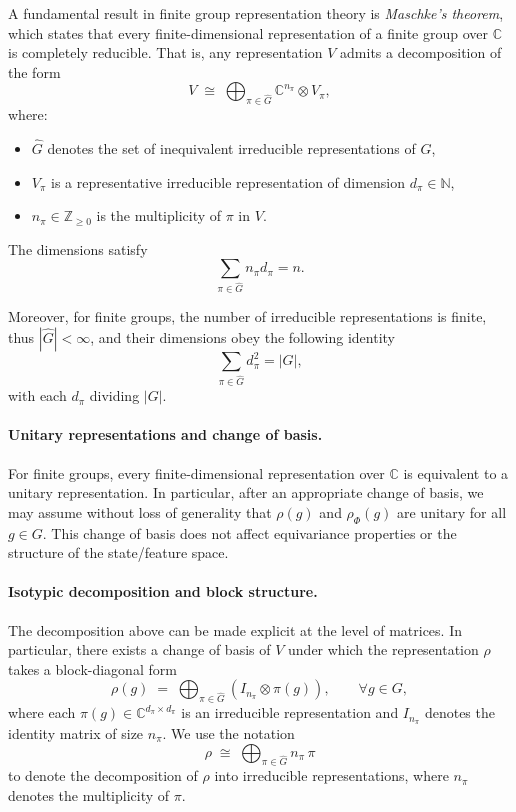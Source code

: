 \documentclass[11pt]{article}
\theoremstyle{plain}
\theoremstyle{definition}
\theoremstyle{remark}
\begin{document}
A fundamental result in finite group representation theory is \emph{Maschke’s theorem}, which states that every finite-dimensional representation of a finite group over $\mathbb{C}$ is completely reducible. That is, any representation $V$ admits a decomposition of the form
\[
V \;\cong\; \bigoplus_{\pi \in \widehat{G}} \mathbb{C}^{n_\pi} \otimes V_\pi,
\]
where:
\begin{itemize}
    \item $\widehat{G}$ denotes the set of inequivalent irreducible representations of $G$,
    \item $V_\pi$ is a representative irreducible representation of dimension $d_\pi \in \mathbb{N}$,
    \item $n_\pi \in \mathbb{Z}_{\ge 0}$ is the multiplicity of $\pi$ in $V$.
\end{itemize}
The dimensions satisfy
\[
\sum_{\pi \in \widehat{G}} n_\pi d_\pi = n.
\]

Moreover, for finite groups, the number of irreducible representations is finite, thus $|\widehat{G}|<\infty$, and their dimensions obey the following identity
\[
\sum_{\pi \in \widehat{G}} d_\pi^2 = |G|,
\]
with each $d_\pi$ dividing $|G|$.


\paragraph{Unitary representations and change of basis.}
For finite groups, every finite-dimensional representation over $\mathbb{C}$ is equivalent to a unitary representation. In particular, after an appropriate change of basis, we may assume without loss of generality that $\rho(g)$ and $\rho_\Phi(g)$ are unitary for all $g \in G$. This change of basis does not affect equivariance properties or the structure of the state/feature space.




\paragraph{Isotypic decomposition and block structure.}
The decomposition above can be made explicit at the level of matrices. In particular, there exists a change of basis of $V$ under which the representation $\rho$ takes a block-diagonal form
\[
\rho(g) \;=\; \bigoplus_{\pi \in \widehat{G}} \left( I_{n_\pi} \otimes \pi(g) \right),
\qquad \forall g \in G,
\]
where each $\pi(g) \in \mathbb{C}^{d_\pi \times d_\pi}$ is an irreducible representation and $I_{n_\pi}$ denotes the identity matrix of size $n_\pi$.
We use the notation
\[
\rho \;\cong\; \bigoplus_{\pi \in \widehat{G}} n_\pi \, \pi
\]
to denote the decomposition of $\rho$ into irreducible representations, where $n_\pi$ denotes the multiplicity of $\pi$.
\end{document}
